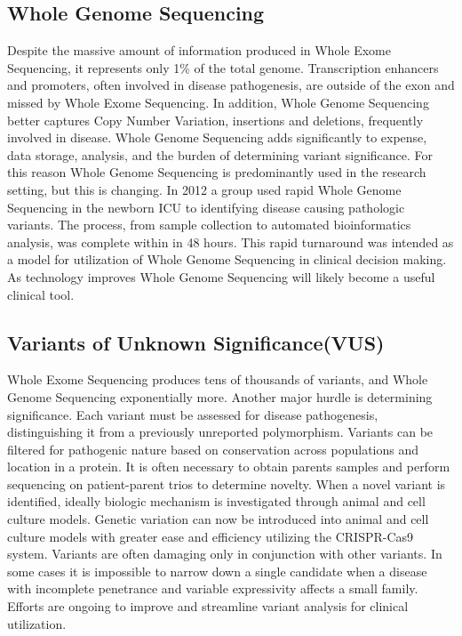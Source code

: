 \documentclass[sigconf]{acmart}
\begin{document}
\subsection{Whole Genome Sequencing}
Despite the massive amount of information produced in Whole Exome Sequencing, it represents only 1\% of the total genome.  Transcription enhancers and promoters, often involved in disease pathogenesis, are outside of the exon and missed by Whole Exome Sequencing.   In addition, Whole Genome Sequencing better captures Copy Number Variation, insertions and deletions, frequently involved in disease. Whole Genome Sequencing adds significantly to expense, data storage, analysis, and the burden of determining variant significance.  For this reason Whole Genome Sequencing is predominantly used in the research setting, but this is changing.  In 2012 a group used rapid Whole Genome Sequencing in the newborn ICU to identifying disease causing pathologic variants.  The process, from sample collection to automated bioinformatics analysis, was complete within in 48 hours.  This rapid turnaround was intended as a model for utilization of Whole Genome Sequencing in clinical decision making.  As technology improves Whole Genome Sequencing will likely become a useful clinical tool. \cite{ng2010whole}

\subsection{Variants of Unknown Significance(VUS)}
Whole Exome Sequencing produces tens of thousands of variants, and Whole Genome Sequencing exponentially more.  Another major hurdle is determining significance.  Each variant must be assessed for disease pathogenesis, distinguishing it from a previously unreported polymorphism. Variants can be filtered for pathogenic nature based on conservation across populations and location in a protein. It is often necessary to obtain parents samples and perform sequencing on patient-parent trios to determine novelty. When a novel variant is identified, ideally biologic mechanism is investigated through animal and cell culture models. Genetic variation can now be introduced into animal and cell culture models with greater ease and efficiency utilizing the CRISPR-Cas9 system. Variants are often damaging only in conjunction with other variants.  In some cases it is impossible to narrow down a single candidate when a disease with incomplete penetrance and variable expressivity affects a small family.  Efforts are ongoing to improve and streamline variant analysis for clinical utilization. \cite{niemitz2007variants} 
\end{document}
